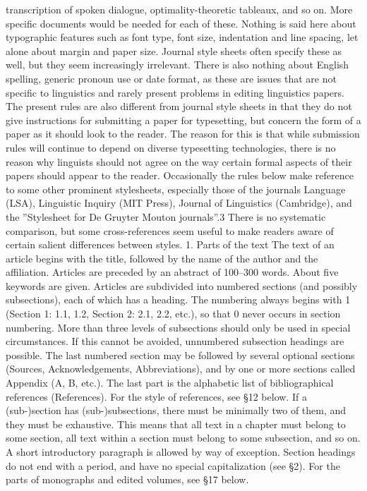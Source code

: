 transcription of spoken dialogue, optimality-theoretic tableaux, and so on. More specific
documents would be needed for each of these.
Nothing is said here about typographic features such as font type, font size, indentation
and line spacing, let alone about margin and paper size. Journal style sheets often specify
these as well, but they seem increasingly irrelevant. There is also nothing about English
spelling, generic pronoun use or date format, as these are issues that are not specific to
linguistics and rarely present problems in editing linguistics papers. The present rules are
also different from journal style sheets in that they do not give instructions for submitting a
paper for typesetting, but concern the form of a paper as it should look to the reader. The
reason for this is that while submission rules will continue to depend on diverse typesetting
technologies, there is no reason why linguists should not agree on the way certain formal
aspects of their papers should appear to the reader.
Occasionally the rules below make reference to some other prominent stylesheets,
especially those of the journals Language (LSA), Linguistic Inquiry (MIT Press), Journal of
Linguistics (Cambridge), and the ”Stylesheet for De Gruyter Mouton journals”.3 There is no
systematic comparison, but some cross-references seem useful to make readers aware of
certain salient differences between styles.
1. Parts of the text
The text of an article begins with the title, followed by the name of the author and the
affiliation. Articles are preceded by an abstract of 100–300 words. About five keywords are
given.
Articles are subdivided into numbered sections (and possibly subsections), each of which
has a heading. The numbering always begins with 1 (Section 1: 1.1, 1.2, Section 2: 2.1, 2.2,
etc.), so that 0 never occurs in section numbering.
More than three levels of subsections should only be used in special circumstances. If
this cannot be avoided, unnumbered subsection headings are possible.
The last numbered section may be followed by several optional sections (Sources,
Acknowledgements, Abbreviations), and by one or more sections called Appendix (A, B,
etc.).
The last part is the alphabetic list of bibliographical references (References). For the
style of references, see §12 below.
If a (sub-)section has (sub-)subsections, there must be minimally two of them, and they
must be exhaustive. This means that all text in a chapter must belong to some section, all
text within a section must belong to some subsection, and so on. A short introductory
paragraph is allowed by way of exception.
Section headings do not end with a period, and have no special capitalization (see §2).
For the parts of monographs and edited volumes, see §17 below.
	
